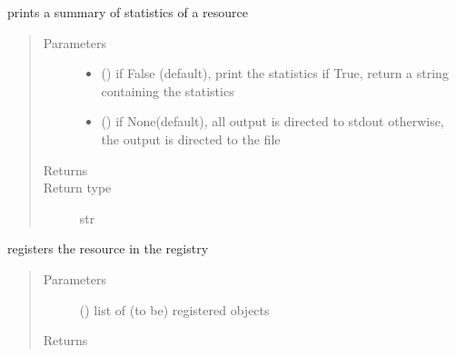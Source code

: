 \documentclass[letterpaper,10pt,english]{sphinxmanual}
\begin{document}
\begin{fulllineitems}
\begin{fulllineitems}
\label{\detokenize{Reference:salabim.Resource.print_statistics}}
prints a summary of statistics of a resource
\begin{quote}\begin{description}
\item[{Parameters}] \leavevmode\begin{itemize}
\item {} 
 () \textendash{} if False (default), print the statistics
if True, return a string containing the statistics

\item {} 
 () \textendash{} if None(default), all output is directed to stdout 
otherwise, the output is directed to the file

\end{itemize}

\item[{Returns}] \leavevmode
{}

\item[{Return type}] \leavevmode
str

\end{description}\end{quote}

\end{fulllineitems}


\begin{fulllineitems}
\label{\detokenize{Reference:salabim.Resource.register}}
registers the resource in the registry
\begin{quote}\begin{description}
\item[{Parameters}] \leavevmode
{} () \textendash{} list of (to be) registered objects

\item[{Returns}] \leavevmode
{}


\end{description}
\end{quote}
\end{fulllineitems}
\end{fulllineitems}
\end{document}
